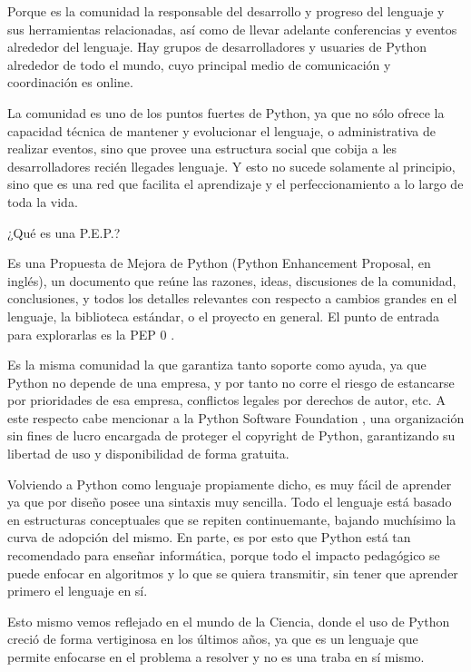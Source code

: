 Porque es la comunidad la responsable del desarrollo y progreso del lenguaje y sus herramientas relacionadas, así como de llevar adelante conferencias y eventos alrededor del lenguaje. Hay grupos de desarrolladores y usuaries de Python alrededor de todo el mundo, cuyo principal medio de comunicación y coordinación es online.

La comunidad es uno de los puntos fuertes de Python, ya que no sólo ofrece la capacidad técnica de mantener y evolucionar el lenguaje, o administrativa de realizar eventos, sino que provee una estructura social que cobija a les desarrolladores recién llegades lenguaje. Y esto no sucede solamente al principio, sino que es una red que facilita el aprendizaje y el perfeccionamiento a lo largo de toda la vida.

\begin{info}
¿Qué es una P.E.P.? 

Es una Propuesta de Mejora de Python (Python Enhancement Proposal, en inglés), un documento que reúne las razones, ideas, discusiones de la comunidad, conclusiones, y todos los detalles relevantes con respecto a cambios grandes en el lenguaje, la biblioteca estándar, o el proyecto en general. El punto de entrada para explorarlas es la PEP 0 \cite{pep0}.
\end{info}

Es la misma comunidad la que garantiza tanto soporte como ayuda, ya que Python no depende de una empresa, y por tanto no corre el riesgo de estancarse por prioridades de esa empresa, conflictos legales por derechos de autor, etc. A este respecto cabe mencionar a la Python Software Foundation \cite{psf}, una organización sin fines de lucro encargada de proteger el copyright de Python, garantizando su libertad de uso y disponibilidad de forma gratuita.

Volviendo a Python como lenguaje propiamente dicho, es muy fácil de aprender ya que por diseño posee una sintaxis muy sencilla. Todo el lenguaje está basado en estructuras conceptuales que se repiten continuemante, bajando muchísimo la curva de adopción del mismo. En parte, es por esto que Python está tan recomendado para enseñar informática, porque todo el impacto pedagógico se puede enfocar en algoritmos y lo que se quiera transmitir, sin tener que aprender primero el lenguaje en sí.

Esto mismo vemos reflejado en el mundo de la Ciencia, donde el uso de Python creció de forma vertiginosa en los últimos años, ya que es un lenguaje que permite enfocarse en el problema a resolver y no es una traba en sí mismo.

